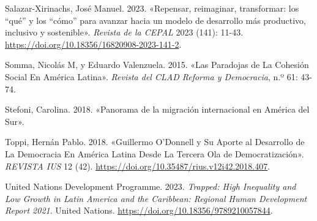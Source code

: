 \documentclass[
  letterpaper,
  DIV=11,
  numbers=noendperiod]{scrartcl}
\newlength{\cslhangindent}
\newenvironment{CSLReferences}[2] %
 {\begin{list}{}{%
  \setlength{\itemindent}{0pt}
  \setlength{\leftmargin}{0pt}
  \setlength{\parsep}{0pt}
  \ifodd #1
   \setlength{\leftmargin}{\cslhangindent}
   \setlength{\itemindent}{-1\cslhangindent}
  \fi
  \setlength{\itemsep}{#2\baselineskip}}}
 {\end{list}}
\begin{document}
\begin{CSLReferences}{1}{0}
Salazar-Xirinachs, José Manuel. 2023. {«{Repensar, reimaginar,
transformar: los {``qu{é}''} y los {``c{ó}mo''} para avanzar hacia un
modelo de desarrollo m{á}s productivo, inclusivo y sostenible}»}.
\emph{Revista de la CEPAL} 2023 (141): 11-43.
\url{https://doi.org/10.18356/16820908-2023-141-2}.

Somma, Nicolás M, y Eduardo Valenzuela. 2015. {«Las {Paradojas} de {La
Cohesi{ó}n Social En Am{é}rica Latina}»}. \emph{Revista del CLAD Reforma
y Democracia}, n.º 61: 43-74.

Stefoni, Carolina. 2018. {«{Panorama de la migraci{ó}n internacional en
Am{é}rica del Sur}»}.

Toppi, Hernán Pablo. 2018. {«Guillermo {O}'{Donnell} y Su Aporte al
Desarrollo de La Democracia En {Am{é}rica Latina} Desde La Tercera Ola
de Democratizaci{ó}n»}. \emph{REVISTA IUS} 12 (42).
\url{https://doi.org/10.35487/rius.v12i42.2018.407}.

United Nations Development Programme. 2023. \emph{Trapped: {High
Inequality} and {Low Growth} in {Latin America} and the {Caribbean}:
{Regional Human Development Report} 2021}. United Nations.
\url{https://doi.org/10.18356/9789210057844}.

\end{CSLReferences}
\end{document}

